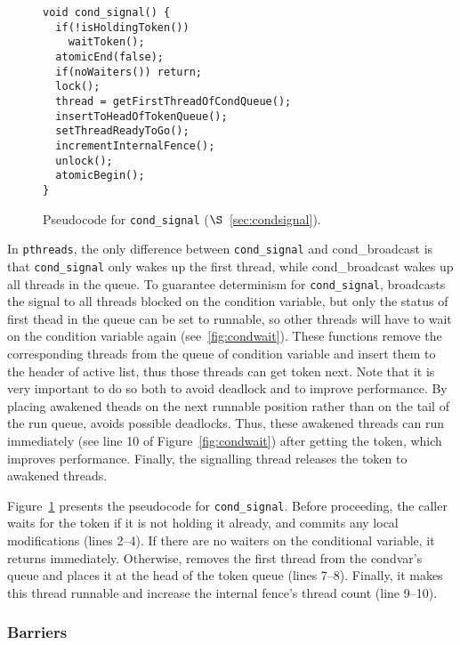 \label{sec:condsignal}

\begin{figure}
\begin{lstlisting}
void cond_signal() {
  if(!isHoldingToken())
    waitToken();
  atomicEnd(false);
  if(noWaiters()) return;
  lock();
  thread = getFirstThreadOfCondQueue();
  insertToHeadOfTokenQueue();
  setThreadReadyToGo();
  incrementInternalFence();
  unlock();
  atomicBegin();
}
\end{lstlisting}
\caption{Pseudocode for \texttt{cond\_signal} ($\S$~\ref{sec:condsignal}). 
\label{fig:condsignal}}
\end{figure}

In \texttt{pthreads}, the only difference between \texttt{cond\_signal}
and cond\_broadcast is that \texttt{cond\_signal} only wakes up the
first thread, while cond\_broadcast wakes up all threads in the
queue. To guarantee determinism for \texttt{cond\_signal}, \dthreads{}
broadcasts the signal to all threads blocked on the condition
variable, but only the status of first thead in the queue can be set
to runnable, so other threads will have to wait on the condition
variable again (see~\ref{fig:condwait}).
These functions remove the corresponding threads from the queue
of condition variable and insert them to the header of active list,
thus those threads can get token next.  Note that it is very important
to do so both to avoid deadlock and to improve performance. By placing
awakened theads on the next runnable position rather than on the tail
of the run queue, \dthreads{} avoids possible deadlocks. 
Thus, these awakened threads can run immediately (see line 10 of Figure~\ref{fig:condwait}) 
after getting the token, which improves performance. Finally, the
signalling thread releases the token to awakened threads.

Figure~\ref{fig:condsignal} presents the pseudocode
for \texttt{cond\_signal}. Before proceeding, the caller waits for
the token if it is not holding it already, and commits any local
modifications (lines 2--4).  If there are no waiters on the
conditional variable, it returns immediately. Otherwise, \dthreads{}
removes the first thread from the condvar's queue and places it at the
head of the token queue (lines 7--8). Finally, it makes this thread
runnable and increase the internal fence's thread count (line 9--10).

\subsubsection{Barriers}

